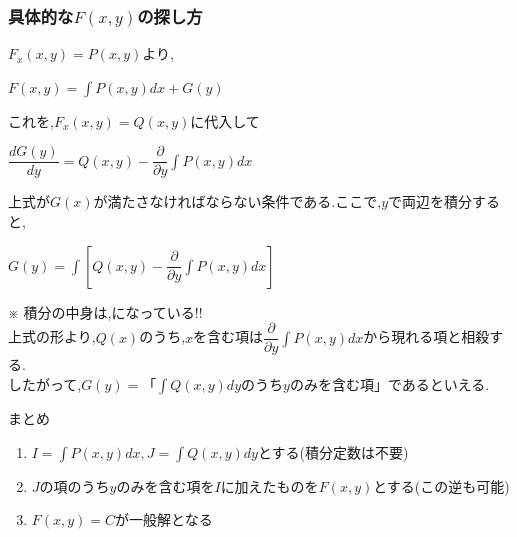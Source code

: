 \documentclass[a4paper]{jsarticle}
\begin{document}
\subsubsection{具体的な$F\left(x,y\right)$の探し方}
$F_x\left(x,y\right)=P\left(x,y\right)$より,
\begin{center}
    $F\left(x,y\right)=\displaystyle\int P\left(x,y\right)dx+G\left(y\right)$
\end{center}
これを,$F_x\left(x,y\right)=Q\left(x,y\right)$に代入して
\begin{center}
    $\displaystyle\dfrac{dG\left(y\right)}{dy}=Q\left(x,y\right)-\dfrac{\partial}{\partial y}\int P\left(x,y\right)dx$
\end{center}
上式が$G\left(x\right)$が満たさなければならない条件である.ここで,$y$で両辺を積分すると,
\begin{center}
    $\displaystyle G\left(y\right)=\int \left[Q\left(x,y\right)-\dfrac{\partial}{\partial y}\int P\left(x,y\right)dx\right]$
\end{center}
※ 積分の中身は,になっている!!\\
上式の形より,$Q\left(x\right)$のうち,$x$を含む項は$\dfrac{\partial}{\partial y}\int P\left(x,y\right)dx$から現れる項と相殺する.\\
したがって,$G\left(y\right)=$「$\int Q\left(x,y\right)dy$のうち$y$のみを含む項」であるといえる.
\begin{itembox}[l]{まとめ}
    \begin{enumerate}[(1)]
        \item $I=\int P\left(x,y\right)dx,J=\int Q\left(x,y\right)dy$とする(積分定数は不要)
        \item $J$の項のうち$y$のみを含む項を$I$に加えたものを$F\left(x,y\right)$とする(この逆も可能)
        \item $F\left(x,y\right)=C$が一般解となる
    \end{enumerate}
\end{itembox}
\end{document}
